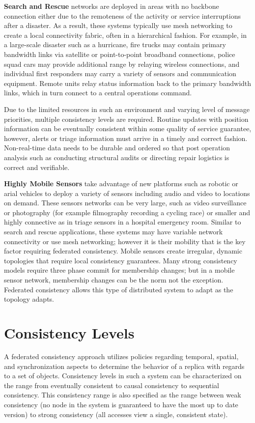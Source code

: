 \documentclass[letterpaper,twocolumn,10pt]{article}
\begin{document}
\textbf{Search and Rescue} networks are deployed in areas with no backbone connection either due to the remoteness of the activity or service interruptions after a disaster. As a result, these systems typically use mesh networking to create a local connectivity fabric, often in a hierarchical fashion. For example, in a large-scale disaster such as a hurricane, fire trucks may contain primary bandwidth links via satellite or point-to-point broadband connections, police squad cars may provide additional range by relaying wireless connections, and individual first responders may carry a variety of sensors and communication equipment. Remote units relay status information back to the primary bandwidth links, which in turn connect to a central operations command.

Due to the limited resources in such an environment and varying level of message priorities, multiple consistency levels are required. Routine updates with position information can be eventually consistent within some quality of service guarantee, however, alerts or triage information must arrive in a timely and correct fashion. Non-real-time data needs to be durable and ordered so that post operation analysis such as conducting structural audits or directing repair logistics is correct and verifiable.

\textbf{Highly Mobile Sensors} take advantage of new platforms such as robotic or arial vehicles to deploy a variety of sensors including audio and video to locations on demand. These sensors networks can be very large, such as video surveillance or photography (for example filmography recording a cycling race) or smaller and highly connective as in triage sensors in a hospital emergency room. Similar to search and rescue applications, these systems may have variable network connectivity or use mesh networking; however it is their mobility that is the key factor requiring federated consistency. Mobile sensors create irregular, dynamic topologies that require local consistency guarantees. Many strong consistency models require three phase commit for membership changes; but in a mobile sensor network, membership changes can be the norm not the exception. Federated consistency allows this type of distributed system to adapt as the topology adapts.

\section{Consistency Levels}

A federated consistency approach utilizes policies regarding temporal, spatial, and synchronization aspects to determine the behavior of a replica with regards to a set of objects. Consistency levels in such a system can be characterized on the range from eventually consistent to causal consistency to sequential consistency. This consistency range is also specified as the range between weak consistency (no node in the system is guaranteed to have the most up to date version) to strong consistency (all accesses view a single, consistent state).
\end{document}
